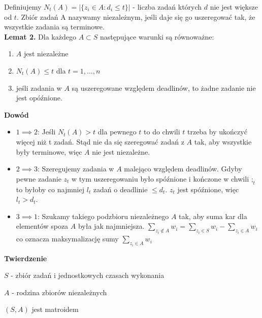 Definiujemy $N_t(A) = |\{z_i \in A : d_i \leq t \} | $ -  liczba zadań których $d$ nie jest większe od $t$. Zbiór zadań A nazywamy niezależnym, jeśli daje się go uszeregować tak, że wszystkie zadania są terminowe. 
\\

\textbf{Lemat 2.} 
Dla każdego $A \subset S$ następujące warunki są równoważne:
\begin{enumerate}
	\item $A$ jest niezależne
	\item $N_t(A) \leq t$ dla $t = 1,...,n$
	\item jeśli zadania w $A$ są uszeregowane względem deadlinów, to żadne zadanie nie jest opóźnione.
\end{enumerate}  

\textbf{Dowód}
\begin{itemize}
	\item{ $1 \implies 2$: 
	Jeśli $N_t(A) > t$ dla pewnego $t$ to do chwili $t$ trzeba by ukończyć więcej niż t zadań. Stąd nie da się szeregować zadań z $A$ tak, aby wszystkie były terminowe, więc $A$ nie jest niezależne.}
	\item{ $2 \implies 3$: 
	Szeregujemy zadania w $A$ malejąco względem deadlinów. Gdyby pewne zadanie $z_t$ w tym uszeregowaniu było spóźnione i kończone w chwili $;_t$ to byłoby co najmniej $l_t$ zadań o deadlinie $\leq d_t$. $z_t$ jest spóźnione, więc $l_t > d_t$.}
	\item{ $3 \implies 1$: 
	Szukamy takiego podzbioru niezależnego $A$ tak, aby suma kar dla elementów spoza $A$ była jak najmniejsza. $\sum_{z_i \not\in A} w_i = \sum_{z_i \in S} w_i - \sum_{z_i \in A} w_i$ co oznacza maksymalizację sumy $\sum_{z_i \in A} w_i$}
\end{itemize}

\textbf{Twierdzenie} 

$S$ - zbiór zadań i jednostkowych czasach wykonania 

$A$ - rodzina zbiorów niezależnych 

$(S,A)$ jest matroidem 


